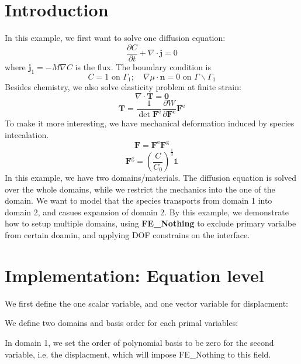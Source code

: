 \hypertarget{growth_Introduction}{}\section{Introduction}\label{growth_Introduction}
In this example, we first want to solve one diffusion equation\+: \[ \frac{\partial C}{\partial t}+\nabla\cdot\boldsymbol{j}=0 \] where $\boldsymbol{j}_1=-M\nabla C$ is the flux. The boundary condition is \[ C=1 \text{ on }\Gamma_1; \quad \nabla \mu\cdot\boldsymbol{n}=0 \text{ on }\Gamma \backslash \Gamma_1 \] Besides chemistry, we also solve elasticity problem at finite strain\+: \[ \nabla\cdot\boldsymbol{T} = \boldsymbol{0} \] \[ \boldsymbol{T}= \frac{1}{\det{\boldsymbol{F}^{\text{e}}}}\frac{\partial W}{\partial \boldsymbol{F}^{\text{e}}}\boldsymbol{F}^{\text{e}} \] To make it more interesting, we have mechanical deformation induced by species intecalation. \[ \boldsymbol{F}=\boldsymbol{F}^{\text{e}}\boldsymbol{F}^{\text{g}} \] \[ \boldsymbol{F}^{\text{g}}=\left(\frac{C}{C_\text{0}}\right)^{\frac{1}{3}}\mathbb{1} \] In this example, we have two domains/materials. The diffusion equation is solved over the whole domains, while we restrict the mechanics into the one of the domain. We want to model that the species transports from domain 1 into domain 2, and casues expansion of domain 2. By this example, we demonstrate how to setup multiple domains, using {\bfseries{F\+E\+\_\+\+Nothing}} to exclude primary varialbe from certain doamin, and applying D\+OF constrains on the interface.\hypertarget{growth_imple}{}\section{Implementation\+: Equation level}\label{growth_imple}
We first define the one scalar variable, and one vector variable for displacment\+: 
\begin{DoxyCode}{0}
\end{DoxyCode}
 We define two domains and basis order for each primal variables\+: 
\begin{DoxyCode}{0}
\end{DoxyCode}
 In domain 1, we set the order of polynomial basis to be zero for the second variable, i.\+e. the displacment, which will impose F\+E\+\_\+\+Nothing to this field.

